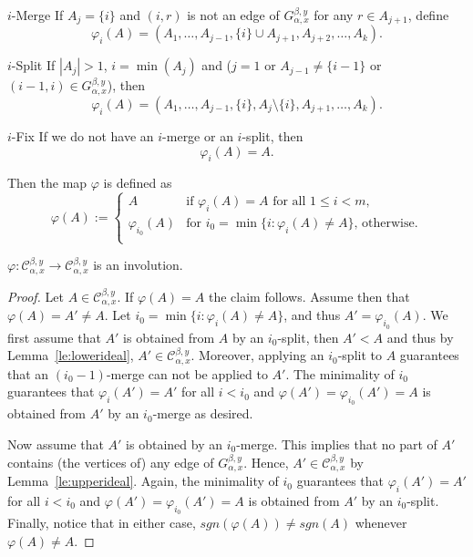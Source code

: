 \begin{enonce*}{$i$-Merge} If $A_j=\{i\}$ and $(i,r)$ is not an edge of $G_{\alpha,x}^{\beta,y}$ for any $r\in A_{j+1}$, 
define
 $$ \varphi_i(A)=(A_1,\ldots,A_{j-1},\{i\}\cup A_{j+1},A_{j+2},\ldots, A_k).$$
\end{enonce*}


\begin{enonce*}{$i$-Split} If $|A_j|>1$, $i=\min(A_j)$ and \big($j=1$ or $A_{j-1}\ne\{i-1\}$ or $(i-1,i)\in G_{\alpha,x}^{\beta,y}$\big), then
 $$ \varphi_i(A)=(A_1,\ldots,A_{j-1},\{i\},A_{j}\setminus\{i\},A_{j+1},\ldots, A_k).$$
\end{enonce*}
 
\begin{enonce*}{$i$-Fix} If we do not have an $i$-merge or an $i$-split, then
 $$\varphi_i(A)=A.$$
\end{enonce*}
 
 Then the map $\varphi$ is defined as
 \begin{equation}\label{eq:involution}
 \varphi(A):=\begin{cases}
 A & \text{if $\varphi_i(A)=A$ for all $1\le i<m$,}\\
 \varphi_{i_0}(A) & \text{for $i_0=\min\big\{i:\varphi_i(A)\ne A\big\}$, otherwise.}\\
 \end{cases}
 \end{equation}

\begin{lemma}\label{le:involution}
 $\varphi\colon \mathcal{C}_{\alpha,x}^{\beta,y} \to \mathcal{C}_{\alpha,x}^{\beta,y}$ is an involution.
\end{lemma}
 
\begin{proof} Let $A\in \mathcal{C}_{\alpha,x}^{\beta,y}$. If $\varphi(A)=A$ the claim follows. Assume then that $\varphi(A)=A'\ne A$. Let $i_0=\min\big\{i:\varphi_i(A)\ne A\big\}$, and thus $A'= \varphi_{i_0}(A)$. We first assume that $A'$ is obtained from $A$ by an $i_0$-split, then $A'<A$ and thus by Lemma~\ref{le:lowerideal}, $A' \in \mathcal{C}_{\alpha,x}^{\beta,y}$. Moreover, applying an $i_0$-split to $A$ guarantees that an $(i_0-1)$-merge can not be applied to $A'$. The minimality of $i_0$ guarantees that $\varphi_i(A')=A'$ for all $i<i_0$ and $\varphi(A')=\varphi_{i_0}(A')=A$ is obtained from $A'$ by an $i_0$-merge as desired.

Now assume that $A'$ is obtained by an $i_0$-merge. This implies that no part of $A'$ contains (the vertices of) any edge of $G_{\alpha,x}^{\beta,y}$. Hence, $A' \in \mathcal{C}_{\alpha,x}^{\beta,y}$ by Lemma~\ref{le:upperideal}. Again, the minimality of $i_0$ guarantees that $\varphi_i(A')=A'$ for all $i<i_0$ and $\varphi(A')=\varphi_{i_0}(A')=A$ is obtained from $A'$ by an $i_0$-split. Finally, notice that in either case, $sgn( \varphi(A))\neq sgn(A)$ whenever $ \varphi(A)\neq A$.
\end{proof}

